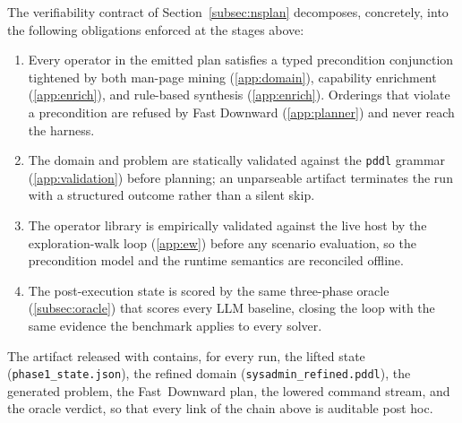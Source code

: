 The verifiability contract of Section~\ref{subsec:nsplan} decomposes, concretely, into the following obligations enforced at the stages above:

\begin{enumerate}
  \item Every operator in the emitted plan satisfies a typed precondition conjunction tightened by both man-page mining (\ref{app:domain}), capability enrichment (\ref{app:enrich}), and rule-based synthesis (\ref{app:enrich}). Orderings that violate a precondition are refused by Fast Downward (\ref{app:planner}) and never reach the harness.
  \item The domain and problem are statically validated against the \texttt{pddl} grammar (\ref{app:validation}) before planning; an unparseable artifact terminates the run with a structured outcome rather than a silent skip.
  \item The operator library is empirically validated against the live host by the exploration-walk loop (\ref{app:ew}) before any scenario evaluation, so the precondition model and the runtime semantics are reconciled offline.
  \item The post-execution state is scored by the same three-phase oracle (\ref{subsec:oracle}) that scores every LLM baseline, closing the loop with the same evidence the benchmark applies to every solver.
\end{enumerate}

The artifact released with \sysrepair contains, for every \nsplan run, the lifted state (\texttt{phase1\_state.json}), the refined domain (\texttt{sysadmin\_refined.pddl}), the generated problem, the Fast~Downward plan, the lowered command stream, and the oracle verdict, so that every link of the chain above is auditable post hoc.
